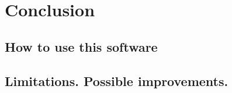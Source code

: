\setlength{\footskip}{8mm}

\chapter{Conclusion}
\label{ch:conclusion}

\section{How to use this software}

\section{Limitations. Possible improvements.}

\FloatBarrier

